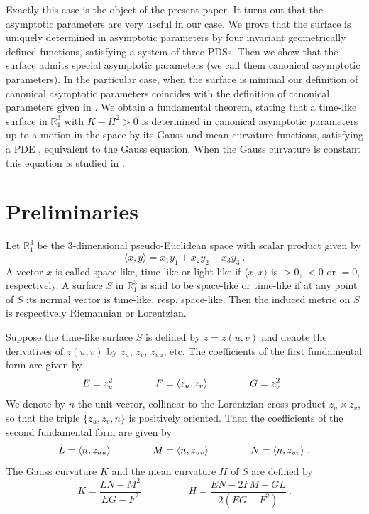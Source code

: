 \documentclass[12pt]{amsart}
\theoremstyle{definition}
\theoremstyle{remark}
\begin{document}
Exactly this case is the object of the present paper. It turns out that the asymptotic parameters are very
useful in our case. We prove  that the surface is uniquely determined in asymptotic parameters
by four invariant geometrically defined functions, satisfying a system of three PDSs. Then
we show that the surface admits special asymptotic parameters (we call them canonical asymptotic parameters).
In the particular case, when the surface is minimal our definition of canonical asymptotic parameters coincides with 
the definition of canonical parameters given in \cite{Ganchev-Krassi-2019}.
We obtain a fundamental theorem, stating that a time-like surface in $\mathbb R_1^3$ 
with $K-H^2>0$ is determined in canonical asymptotic parameters up to a motion in the space by 
its Gauss and mean curvature functions, satisfying a PDE , equivalent to the Gauss equation. 
When the Gauss curvature is constant this equation is studied in \cite{G-H-I}.




\vspace{0.5cm}
 


 

 
\section{Preliminaries}

Let $\mathbb R^3_1$ be the 3-dimensional pseudo-Euclidean space with scalar product given by
$$
	\langle x,y \rangle=x_1y_1+x_2y_2-x_3y_3  \ .
$$
A vector $x$ is called space-like, time-like or light-like if $\langle x,x \rangle$ is $>0$, 
$<0$ or $=0$, respectively. A surface  $S$ in $\mathbb R^3_1$ is said to be space-like or time-like 
if at any point of $S$ its normal vector is time-like, resp. space-like. Then the induced metric on $S$
is respectively Riemannian or Lorentzian. 

Suppose the time-like surface $S$ is defined by $	z=z(u,v) $ and denote the derivatives of $z(u,v)$ by
$	z_u $, $z_v$, $z_{uu}$, etc. The coefficients of the first fundamental form are given by 
$$
	E=z_u^2  \hspace{1.5cm}  F=\langle z_u,z_v \rangle   \hspace{1.5cm}  G=z_v^2  \ .
$$
We denote by $n$ the unit vector, collinear to the Lorentzian cross product $z_u\times z_v$, so that
the triple $\{ z_u,z_v,n \}$ is positively oriented. Then the coefficients of  the second fundamental form 
are given by
$$
	L=\langle n,z_{uu} \rangle  \hspace{1.5cm}   M=\langle n,z_{uv} \rangle \hspace{1.5cm}  N=\langle n,z_{vv} \rangle \ .
$$
The Gauss curvature $K$ and the mean curvature $H$ of $S$ are defined by
$$
	K=\frac{LN-M^2}{EG-F^2}    \hspace{2cm}  H=\frac{EN-2FM+GL}{2(EG-F^2)} \ .
$$
\end{document}
